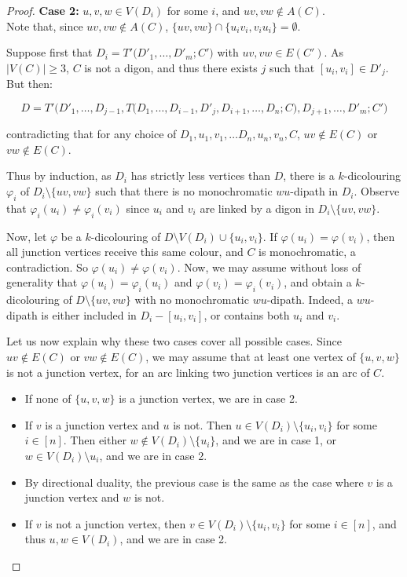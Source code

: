 \begin{proof}
    \noindent\textbf{Case 2:} $u,v,w \in V(D_i)$ for some $i$, and  $uv,vw \notin A(C)$. \\
    Note that, since $uv,vw \notin A(C)$, $\{uv,vw\} \cap \{u_iv_i, v_iu_i\}=\emptyset$.

    Suppose first that $D_i = T'\big(D'_1, \dots, D'_m;C'\big)$ with $uv, vw \in E(C')$. As $|V(C)| \geq 3$, $C$ is not a digon, and thus there exists $j$ such that $[u_i, v_i] \in D'_j$. But then:
    
    $$D = T'\big(D'_1, \dots, D_{j-1}, T\big(D_1, \dots, D_{i-1}, D'_{j}, D_{i+1}, \dots, D_n;C\big)  , D_{j+1}, \dots, D'_m;C'\big)$$

    contradicting that for any choice of $D_1, u_1, v_1, \dots D_n, u_n, v_n, C$, $uv \notin E(C)$ or $vw \notin E(C)$. 

    Thus by induction, as $D_i$ has strictly less vertices than $
    D$, there is a $k$-dicolouring $\varphi_i$ of $D_i\setminus \{uv,vw\}$ such that there is no monochromatic $wu$-dipath in $D_i$. Observe that $\varphi_i(u_i) \neq \varphi_i(v_i)$ since $u_i$ and $v_i$ are linked by a digon in  $D_i\setminus \{uv,vw\}$. 

    Now, let $\varphi$ be a $k$-dicolouring of $D \setminus V(D_i) \cup \{u_i,v_i\}$.
    If $\varphi(u_i) = \varphi(v_i)$, then all junction vertices receive this same colour, and $C$ is monochromatic, a contradiction. So $\varphi(u_i) \neq \varphi(v_i)$. Now, we may assume without loss of generality that $\varphi(u_i) = \varphi_i(u_i)$ and $\varphi(v_i) = \varphi_i(v_i)$, and obtain a $k$-dicolouring of $D \setminus \{uv,vw\}$ with no monochromatic $wu$-dipath. Indeed, a $wu$-dipath is either included in $D_i-[u_i,v_i]$, or contains both $u_i$ and $v_i$.  \smallskip

    Let us now explain why these two cases cover all possible cases. 
    Since $uv \notin E(C)$ or $vw \notin E(C)$, we may assume that at least one vertex of $\{u,v,w\}$ is not a junction vertex, for an arc linking two junction vertices is an arc of $C$. 

    \begin{itemize}
        \item If none of $\{u,v,w\}$ is a junction vertex, we are in case 2. 
        \item  If $v$ is a junction vertex and $u$ is not. Then $u \in V(D_i)\setminus \{u_i,v_i\}$ for some $i \in [n]$. Then either $w \notin V(D_i) \setminus \{u_i\}$, and we are in case 1, or $w \in V(D_i) \setminus u_i$, and we are in case 2. 
        \item By directional duality, the previous case is the same as the case where $v$ is a junction vertex and $w$ is not. 
        \item If $v$ is not a junction vertex, then $v \in V(D_i) \setminus \{u_i,v_i\}$ for some $i \in [n]$, and thus $u,w \in V(D_i)$, and we are in case 2.  
    \end{itemize}
    

\end{proof}
